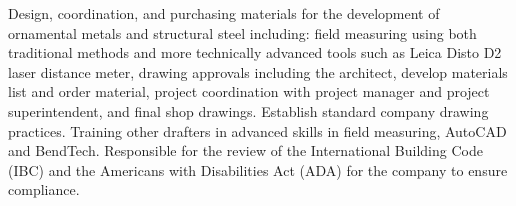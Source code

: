 \documentclass[12pt]{extarticle}
\begin{document}
Design, coordination, and purchasing materials for the development of ornamental metals and structural steel including: field
measuring using both traditional methods and more technically advanced tools such as Leica Disto D2 laser distance meter,
drawing approvals including the architect, develop materials list and order material, project coordination with project manager
and project superintendent, and final shop drawings.
Establish standard company drawing practices.
Training other drafters in advanced skills in field measuring, AutoCAD and BendTech.
Responsible for the review of the International Building Code (IBC) and the Americans with Disabilities Act (ADA) for the
company to ensure compliance.
\end{document}
